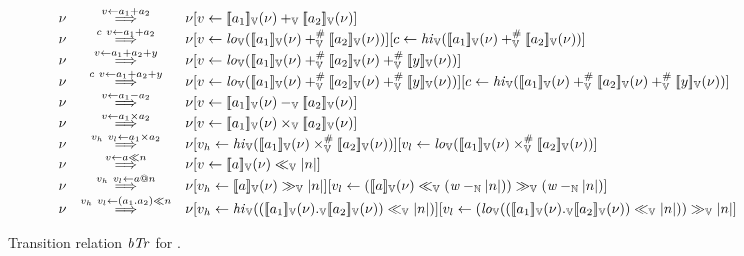 \begin{figure*}
\[
\begin{array}{rcl}
\bvst & \goesto{v \leftarrow a_1 + a_2} & \bvst[v \leftarrow \bvvalueof{a_1}(\bvst) +_\bvop \bvvalueof{a_2}(\bvst)] \\
\bvst & \goesto{c\ v \leftarrow a_1 + a_2} & \bvst[v \leftarrow \lo_\bvop(\bvvalueof{a_1}(\bvst) +_\bvop^\# \bvvalueof{a_2}(\bvst))][c \leftarrow \hi_\bvop(\bvvalueof{a_1}(\bvst) +_\bvop^\# \bvvalueof{a_2}(\bvst))] \\
\bvst & \goesto{v \leftarrow a_1 + a_2 + y} & \bvst[v \leftarrow \lo_\bvop(\bvvalueof{a_1}(\bvst) +_\bvop^\# \bvvalueof{a_2}(\bvst) +_\bvop^\# \bvvalueof{y}(\bvst))] \\
\bvst & \goesto{c\ v \leftarrow a_1 + a_2 + y} & \bvst[v \leftarrow \lo_\bvop(\bvvalueof{a_1}(\bvst) +_\bvop^\# \bvvalueof{a_2}(\bvst) +_\bvop^\# \bvvalueof{y}(\bvst))][c \leftarrow \hi_\bvop(\bvvalueof{a_1}(\bvst) +_\bvop^\# \bvvalueof{a_2}(\bvst) +_\bvop^\# \bvvalueof{y}(\bvst))] \\
\bvst & \goesto{v \leftarrow a_1 - a_2} & \bvst[v \leftarrow \bvvalueof{a_1}(\bvst) -_\bvop \bvvalueof{a_2}(\bvst)] \\
\bvst & \goesto{v \leftarrow a_1 \times a_2} & \bvst[v \leftarrow \bvvalueof{a_1}(\bvst) \times_\bvop \bvvalueof{a_2}(\bvst)] \\
\bvst & \goesto{v_h\ v_l \leftarrow a_1 \times a_2} & \bvst[v_h \leftarrow \hi_\bvop(\bvvalueof{a_1}(\bvst) \times_\bvop^\# \bvvalueof{a_2}(\bvst))][v_l \leftarrow \lo_\bvop(\bvvalueof{a_1}(\bvst) \times_\bvop^\# \bvvalueof{a_2}(\bvst))] \\
\bvst & \goesto{v \leftarrow a \ll n} & \bvst[v \leftarrow \bvvalueof{a}(\bvst) \ll_\bvop \unsigned{n}] \\
\bvst & \goesto{v_h\ v_l \leftarrow a @ n} & \bvst[v_h \leftarrow \bvvalueof{a}(\bvst) \gg_\bvop \unsigned{n}][v_l \leftarrow (\bvvalueof{a}(\bvst) \ll_\bvop (\wordsize -_{\bbfN} \unsigned{n})) \gg_\bvop (\wordsize -_{\bbfN} \unsigned{n})] \\
\bvst & \goesto{v_h\ v_l \leftarrow (a_1 . a_2) \ll n} & \bvst[v_h \leftarrow \hi_\bvop((\bvvalueof{a_1}(\bvst) ._\bvop \bvvalueof{a_2}(\bvst)) \ll_\bvop \unsigned{n})][v_l \leftarrow (\lo_\bvop((\bvvalueof{a_1}(\bvst) ._\bvop \bvvalueof{a_2}(\bvst)) \ll_\bvop \unsigned{n})) \gg_\bvop \unsigned{n}] \\
\end{array}
\]
\caption{Transition relation $\mathit{bTr}$ for \bvdsl. \label{fig:semantic-function-bvdsl}}
\end{figure*}

